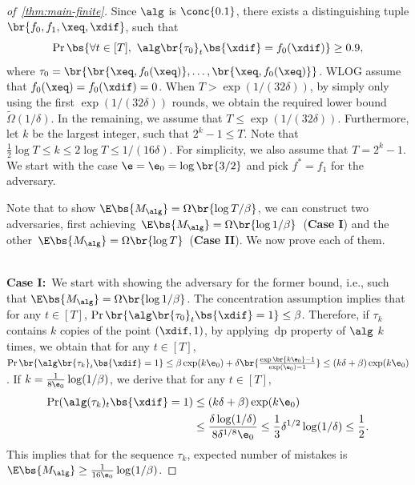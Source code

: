 \begin{proof}[of~\cref{thm:main-finite}]
    Since \(\alg\) is \(\conc{0.1}\), there exists a distinguishing tuple \(\br{f_0, f_1, \xeq, \xdif}\), such that 
    \begin{equation}
        \Pr \bs{\forall t \in [T],\ \alg \br{\tau_0}_t\bs{\xdif} = f_0(\xdif)} \geq 0.9,
    \end{equation}
    where \(\tau_0 = \br{\br{\xeq, f_0(\xeq)}, \ldots, \br{\xeq, f_0(\xeq)}}\).
    WLOG assume that \(f_0(\xeq) = f_0(\xdif) = 0\).
    When \(T > \exp(1 / (32\delta))\), by simply only using the first \(\exp(1 / (32\delta))\) rounds, we obtain the required lower bound \(\widetilde\Omega(1 / \delta)\). In the remaining, we assume that \(T \leq \exp(1 / (32\delta))\).
    Furthermore, let \(k\) be the largest integer, such that \(2^k - 1 \leq T\). 
    Note that \(\frac{1}{2}\log{T} \leq k \leq 2\log T \leq 1/(16\delta)\). 
    For simplicity, we also assume that \(T = 2^k - 1\). We start with the case \(\e = \e_0 = \log\br{3/2}\) and pick \(f^\ast = f_1\) for the adversary.
    
    Note that to show \(\E \bs{M_\alg} = \Omega\br{\log T / \beta}\), we can construct two adversaries, first achieving~\(\E \bs{M_\alg} = \Omega\br{\log 1 / \beta}\)~(\textbf{Case I}) and the other~\(\E \bs{M_\alg} = \Omega\br{\log T}\)~(\textbf{Case II}). We now prove each of them.\\~\
    
    \noindent\textbf{Case I:}~We start with showing the adversary for the former bound, i.e., such that \(\E \bs{M_\alg} = \Omega\br{\log 1 / \beta}\).
    The concentration assumption implies that for any \(t \in [T]\), \(\Pr\br{\alg\br{\tau_0}_t\bs{\xdif} = 1} \leq \beta\).
    Therefore, if \(\tau_k\) contains \(k\) copies of the point \((\xdif, 1)\),  by applying~\Gls{dp} property of \(\alg\) \(k\) times, we obtain that for any \(t \in [T]\),
    \(\Pr\br{\alg\br{\tau_k}_t\bs{\xdif} = 1} \leq \beta \exp(k \e_0) + \delta \br{\frac{\exp\br{k\e_0} - 1}{\exp(\e_0) - 1}} \leq (k \delta + \beta)\exp(k \e_0)\).
    If \(k = \frac{1}{8 \e_0} \log (1 / \beta)\), we derive that for any \(t \in [T]\), 
    \begin{equation}
    \begin{aligned}
        \Pr(\alg(\tau_k)_t\bs{\xdif} = 1) &\leq (k \delta + \beta) \exp(k \e_0) \\
        &\leq \frac{\delta \log (1/\delta)}{8 \delta^{1/8} \e_0} \leq \frac{1}{3} \delta^{1/2} \log (1 / \delta) \leq \frac{1}{2}.
    \end{aligned}
    \end{equation} This implies that for the sequence \(\tau_k\), expected number of mistakes is \(\E\bs{M_{\alg}} \geq \frac{1}{16 \e_0} \log (1 / \beta)\). 
    

\end{proof}
